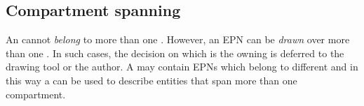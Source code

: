



\subsection{Compartment spanning}

An  cannot \emph{belong} to more than one
. However, an EPN can be \emph{drawn} over more than one
. In such cases, the decision on which is the owning
 is deferred to the drawing tool or the
author. A  may contain EPNs which belong to different
 and in this way a  can be used to describe
entities that span more than one {compartment}.

